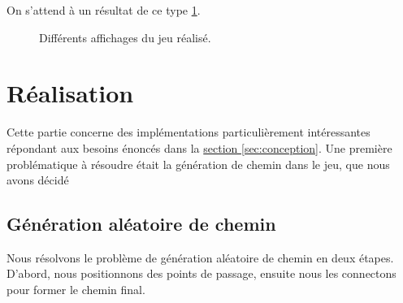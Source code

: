 \documentclass{article}
\begin{document}
On s'attend à un résultat de ce type \ref{fig:affichages}.

\begin{figure}[H]
    \centering
    \qquad
    \caption{Différents affichages du jeu réalisé.}%
    \label{fig:affichages}%
     \vspace*{-0.3cm}
\end{figure}

\section{Réalisation}

Cette partie concerne des implémentations particulièrement intéressantes répondant aux besoins énoncés dans la \hyperref[sec:conception]{section \ref{sec:conception}}. Une première problématique à résoudre était la génération de chemin dans le jeu, que nous avons décidé 

\subsection{Génération aléatoire de chemin}
Nous résolvons le problème de génération aléatoire de chemin en deux étapes. D'abord, nous positionnons des points de passage, ensuite nous les connectons pour former le chemin final.
\end{document}
